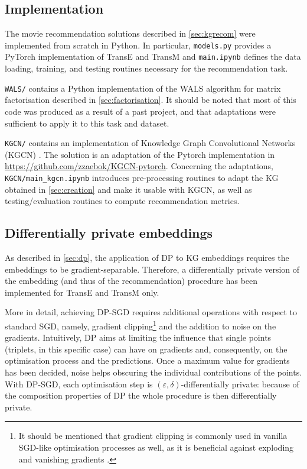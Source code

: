 \subsection{Implementation}\label{sec:implementation}

The movie recommendation solutions described in \cref{sec:kgrecom} were implemented  from scratch in Python.
In particular, \texttt{models.py} provides a PyTorch implementation of TransE and TransM and \texttt{main.ipynb} defines the data loading, training, and testing routines necessary for the recommendation task.

\texttt{WALS/} contains a Python implementation of the WALS algorithm for matrix factorisation described in \cref{sec:factorisation}.
It should be noted that most of this code was produced as a result of a past project, and that adaptations were sufficient to apply it to this task and dataset.

\texttt{KGCN/}  contains an implementation of Knowledge Graph Convolutional Networks (KGCN) \parencite{wang2019knowledge}.
The solution is an adaptation of the Pytorch implementation in \url{https://github.com/zzaebok/KGCN-pytorch}.
Concerning the adaptations, \texttt{KGCN/main\_kgcn.ipynb} introduces pre-processing routines to adapt the KG obtained in \cref{sec:creation} and make it usable with KGCN, as well as testing/evaluation routines to compute recommendation metrics.



\subsection{Differentially private embeddings}

As described in \cref{sec:dp}, the application of DP to KG embeddings requires the embeddings to be gradient-separable.
Therefore, a differentially private version of the embedding (and thus of the recommendation) procedure has been implemented for TransE and TransM only.

More in detail, achieving DP-SGD requires additional operations with respect to standard SGD, namely, gradient clipping\footnote{It should be mentioned that gradient clipping is commonly used in vanilla SGD-like optimisation processes as well, as it is beneficial against exploding and vanishing gradients \parencite{pascanu2013difficulty}.} and the addition to noise on the gradients.
Intuitively, DP aims at limiting the influence that single points (triplets, in this specific case) can have on gradients and, consequently, on the optimisation process and the predictions.
Once a maximum value for gradients has been decided, noise helps obscuring the individual contributions of the points.
With DP-SGD, each optimisation step is $(\varepsilon, \delta)$-differentially private: because of the composition properties of DP \parencite{dwork2014algorithmic} the whole procedure is then differentially private.

